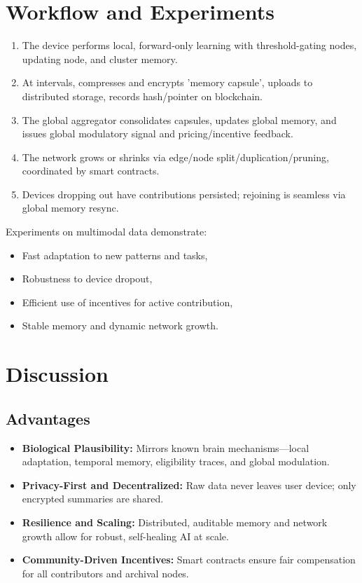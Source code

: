 \documentclass[11pt]{article}
\begin{document}
\section{Workflow and Experiments}
\begin{enumerate}
    \item The device performs local, forward-only learning with threshold-gating nodes, updating node, and cluster memory.
    \item At intervals, compresses and encrypts 'memory capsule', uploads to distributed storage, records hash/pointer on blockchain.
    \item The global aggregator consolidates capsules, updates global memory, and issues global modulatory signal and pricing/incentive feedback.
    \item The network grows or shrinks via edge/node split/duplication/pruning, coordinated by smart contracts.
    \item Devices dropping out have contributions persisted; rejoining is seamless via global memory resync.
\end{enumerate}
Experiments on multimodal data demonstrate: 
\begin{itemize}
    \item Fast adaptation to new patterns and tasks,
    \item Robustness to device dropout,
    \item Efficient use of incentives for active contribution,
    \item Stable memory and dynamic network growth.
\end{itemize}

\section{Discussion}
\subsection{Advantages}
\begin{itemize}
    \item \textbf{Biological Plausibility:} Mirrors known brain mechanisms—local adaptation, temporal memory, eligibility traces, and global modulation.
    \item \textbf{Privacy-First and Decentralized:} Raw data never leaves user device; only encrypted summaries are shared.
    \item \textbf{Resilience and Scaling:} Distributed, auditable memory and network growth allow for robust, self-healing AI at scale.
    \item \textbf{Community-Driven Incentives:} Smart contracts ensure fair compensation for all contributors and archival nodes.
\end{itemize}
\end{document}
